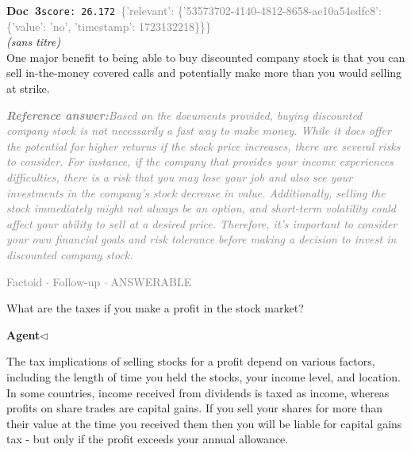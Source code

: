 \documentclass[a4paper,11pt]{article}
\begin{document}
\begin{docenv}
{\footnotesize\textcolor{doccolor}{\textbf{Doc~3}}}\hfill{\tiny\texttt{score:~26.172}}\ {\tiny\textcolor{gray}{\{'relevant': \{'53573702-4140-4812-8658-ae10a54edfc8': \{'value': 'no', 'timestamp': 1723132218\}\}\}}}\\[3pt]
{\small\textit{(sans titre)}}\\[2pt]
\vspace{2pt}
{\footnotesize 
One major benefit to being able to buy discounted company stock is that you can sell in-the-money covered calls and potentially make more than you would selling at strike.}
\end{docenv}
\begin{refanswerenv}
{\footnotesize\textit{\textcolor{gray}{\textbf{Reference answer:}\enspace Based on the documents provided, buying discounted company stock is not necessarily a fast way to make money. While it does offer the potential for higher returns if the stock price increases, there are several risks to consider. For instance, if the company that provides your income experiences difficulties, there is a risk that you may lose your job and also see your investments in the company's stock decrease in value. Additionally, selling the stock immediately might not always be an option, and short-term volatility could affect your ability to sell at a desired price. Therefore, it's important to consider your own financial goals and risk tolerance before making a decision to invest in discounted company stock.}}}
\end{refanswerenv}
\vspace{0.5em}
\hfill{\tiny\textcolor{gray}{Factoid $\cdot$ Follow-up $\cdot$ ANSWERABLE}}
\begin{userbubble}
What are the taxes if you make a profit in the stock market?
\end{userbubble}
\noindent\hfill{\small\textcolor{agentcolor}{\textbf{Agent\enspace$\triangleleft$}}}
\begin{agentbubble}
The tax implications of selling stocks for a profit depend on various factors, including the length of time you held the stocks, your income level, and location. In some countries, income received from dividends is taxed as income, whereas profits on share trades are capital gains.  If you sell your shares for more than their value at the time you received them then you will be liable for capital gains tax - but only if the profit exceeds your annual allowance.
\end{agentbubble}
\end{document}
